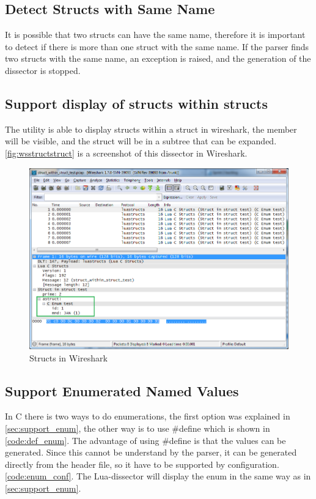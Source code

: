 

\subsection{Detect Structs with Same Name}
It is possible that two structs can have the same name, therefore it is 
important to detect if there is more than one struct with the same name. If 
the parser finds two structs with the same name, an exception is 
raised, and the generation of the dissector is stopped.

\subsection{Support display of structs within structs}
The utility is able to display structs within a struct in wireshark, the 
member will be visible, and the struct will be in a subtree that can be 
expanded. \autoref{fig:wsstructstruct} is a screenshot of this dissector in 
Wireshark.

\begin{figure}[ht]
	\center
	\includegraphics[width=\textwidth]{./sprints/img/wireshark_structwithstruct}
	\caption{Structs in Wireshark\label{fig:wsstructstruct}}
\end{figure}

\subsection{Support Enumerated Named Values}
In C there is two ways to do enumerations, the first option was explained in 
\autoref{sec:support_enum}, the other way is to use \#define which is shown in 
\autoref{code:def_enum}. The advantage of using \#define is  that the values 
can be generated. Since this cannot be understand by the parser, it can be 
generated directly from the header file, so it have to be supported by 
configuration. \autoref{code:enum_conf}. The Lua-dissector will display the 
enum in the same way as in \autoref{sec:support_enum}.

